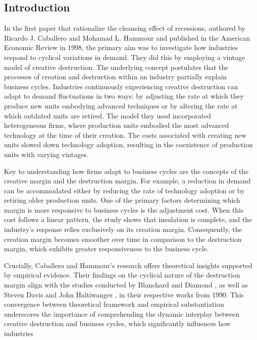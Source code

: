 \documentclass[12pt]{article}
\begin{document}
\subsection{Introduction}
In the first paper that rationalize the cleansing effect of recessions, authored by Ricardo J. Caballero and Mohamad L.
Hammour  \cite{CabHarm94} and published in the American Economic Review in 1998, the primary aim was to investigate how
industries respond to cyclical variations in demand. They did this by employing a vintage model of creative destruction.
The underlying concept postulates that the processes of creation and destruction within an industry partially explain
business cycles. Industries continuously experiencing creative destruction can adapt to demand fluctuations in two
ways: by adjusting the rate at which they produce new units embodying advanced techniques or by altering the
rate at which outdated units are retired. The model they used incorporated heterogeneous firms, where production units
embodied the most advanced technology at the time of their creation. The costs associated with creating new units
slowed down technology adoption, resulting in the coexistence of production units with varying vintages.
\par
Key to understanding how firms adapt to business cycles are the concepts of the creative margin and the destruction
margin. For example, a reduction in demand can be accommodated either by reducing the rate of technology adoption or by
retiring older production units. One of the primary factors determining which margin is more responsive to business
cycles is the adjustment cost. When this cost follows a linear pattern, the study shows that insulation is complete, and
the industry's response relies exclusively on its creation margin. Consequently, the creation margin becomes smoother
over time in comparison to the destruction margin, which exhibits greater responsiveness to the business cycle.
\par
Crucially, Caballero and Hammour's research \cite{BlaDia90} offers theoretical insights supported by empirical
evidence. Their findings on the cyclical nature of the destruction margin align with the studies conducted by Blanchard
and Diamond \cite{BlaDia90}, as well as Steven Davis and John Haltiwanger \cite{DavHalt92}, in their respective works
from 1990. This
convergence between theoretical framework and empirical substantiation underscores the importance of comprehending the
dynamic interplay between creative destruction and business cycles, which significantly influences how industries
\end{document}
